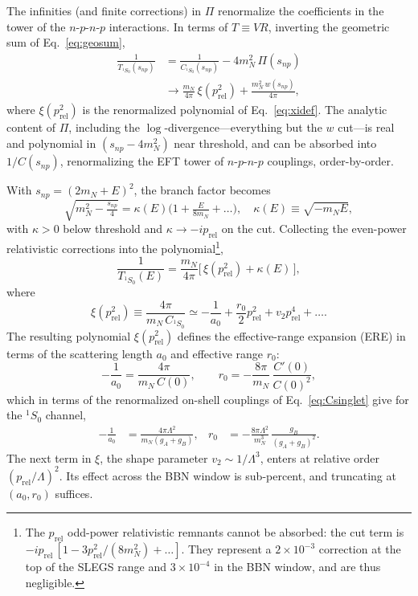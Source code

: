 \documentclass[
  aps,prd,twocolumn,nofootinbib,superscriptaddress,
  longbibliography,floatfix,preprintnumbers
]{revtex4-2}
\newcommand{\prel}{p_{\mathrm{rel}}}
\begin{document}
The infinities (and finite corrections) in $\Pi$ renormalize the coefficients in the tower of the $n$-$p$-$n$-$p$ interactions.
In terms of $T \equiv V R$, inverting the geometric sum of Eq.~\eqref{eq:geosum},
\begin{equation}
\begin{split}
  \frac{1}{T_{^1S_0}(s_{np})} &= \frac{1}{C_{^1S_0}(s_{np})} - 4m_N^{2}\,\Pi(s_{np})\\
  &\rightarrow \frac{m_N}{4\pi}\,\xi(\prel^2) + \frac{m_N^{2}\,w(s_{np})}{4\pi},
\end{split}
\label{eq:Minv}
\end{equation}
where $\xi(\prel^2)$ is the renormalized polynomial of Eq.~\eqref{eq:xidef}.
The analytic content of $\Pi$, including the $\log$-divergence---everything but
the $w$ cut---is real and polynomial in $(s_{np}-4m_N^{2})$ near threshold, and
can be absorbed into $1/C(s_{np})$, renormalizing the EFT tower of $n$-$p$-$n$-$p$
couplings, order-by-order.

With $s_{np} = (2m_N + E)^2$, the branch factor becomes
\begin{equation}
  \sqrt{m_N^2 - \tfrac{s_{np}}{4}} = \kappa(E)\Big(1 + \tfrac{E}{8m_N} + \dots\Big),
  \quad \kappa(E) \equiv \sqrt{-m_N E},
\end{equation}
with $\kappa>0$ below threshold and $\kappa \to -i\prel$ on the cut. Collecting
the even-power relativistic corrections into the polynomial\footnote{The $\prel$ odd-power relativistic remnants cannot be absorbed: the cut term is $-i\prel\,[1 - 3\prel^2/(8m_N^2) + \dots]$. 
They represent a $2\times10^{-3}$ correction at the top of the SLEGS range and $3\times10^{-4}$ in the BBN window, and are thus negligible.},
\begin{equation}
  \frac{1}{T_{^1S_0}(E)} = \frac{m_N}{4\pi}\Big[\,\xi(\prel^2) + \kappa(E)\,\Big],
\label{eq:NRform}
\end{equation}
where
\begin{equation}
  \xi(\prel^2) \equiv \frac{4\pi}{m_N\,C_{^1S_0}}
      \simeq -\frac{1}{a_0} + \frac{r_0}{2}\prel^2 + v_2 \prel^4 + \dots.
\label{eq:xidef}
\end{equation}
The resulting polynomial $\xi(\prel^2)$ defines the effective-range expansion (ERE) in terms of the scattering length $a_0$ and effective range $r_0$:
\begin{equation}
  -\frac{1}{a_0} = \frac{4\pi}{m_N\,C(0)},\qquad
  r_0 = -\frac{8\pi}{m_N}\,\frac{C'(0)}{C(0)^{2}},
  \label{eq:EREmap}
\end{equation}
which in terms of the renormalized on-shell couplings of Eq.~\eqref{eq:Csinglet} give for the $^{1}S_{0}$ channel,
\begin{align}
  -\frac{1}{a_0} &= \frac{4\pi\Lambda^{2}}{m_N(g_A+g_B)}, &
  r_0 &= -\frac{8\pi\Lambda^{2}}{m_N^{3}}\,\frac{g_B}{(g_A+g_B)^{2}}.
  \label{eq:EREsinglet}
\end{align}
The next term in $\xi$, the shape parameter $v_2\sim1/\Lambda^{3}$, enters at relative order
$(\prel/\Lambda)^{2}$. Its effect across the BBN window is
sub-percent, and truncating at $(a_0,r_0)$ suffices.
\end{document}
